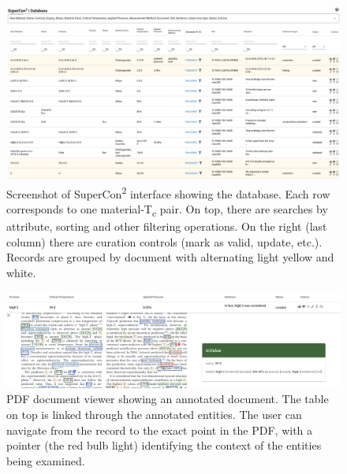 \documentclass[]{interact}
\theoremstyle{plain} %
\theoremstyle{definition}
\theoremstyle{remark}
\begin{document}
\begin{figure}[ht]
  \centering
  \includegraphics[width=1\textwidth]{images/supercon-curation-database} 
  \caption{Screenshot of SuperCon\textsuperscript{2} interface showing the database. Each row corresponds to one material-T\textsubscript{c} pair. On top, there are searches by attribute, sorting and other filtering operations. On the right (last column) there are curation controls (mark as valid, update, etc.).   Records are grouped by document with alternating light yellow and white. }
  \label{fig:curation-interface-database}
\end{figure}

\begin{figure}[ht]
  \centering
  \includegraphics[width=1\textwidth]{images/pdf-view-context.png} 
  \caption{PDF document viewer showing an annotated document. The table on top is linked through the annotated entities. The user can navigate from the record to the exact point in the PDF, with a pointer (the red bulb light) identifying the context of the entities being examined. }
  \label{fig:pdf-view}
\end{figure}
\end{document}
